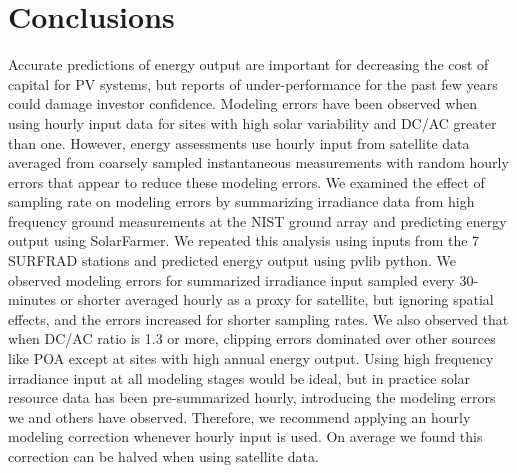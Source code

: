\documentclass[conference]{IEEEtran}
\begin{document}
\section{Conclusions}
Accurate predictions of energy output are important for decreasing the cost of capital for PV systems, but reports of under-performance for the past few years could damage investor confidence. Modeling errors have been observed when using hourly input data for sites with high solar variability and DC/AC greater than one. However, energy assessments use hourly input from satellite data averaged from coarsely sampled instantaneous measurements with random hourly errors that appear to reduce these modeling errors. We examined the effect of sampling rate on modeling errors by summarizing irradiance data from high frequency ground measurements at the NIST ground array and predicting energy output using SolarFarmer. We repeated this analysis using inputs from the 7 SURFRAD stations and predicted energy output using pvlib python. We observed modeling errors for summarized irradiance input sampled every 30-minutes or shorter averaged hourly as a proxy for satellite, but ignoring spatial effects, and the errors increased for shorter sampling rates. We also observed that when DC/AC ratio is 1.3 or more, clipping errors dominated over other sources like POA except at sites with high annual energy output. Using high frequency irradiance input at all modeling stages would be ideal, but in practice solar resource data has been pre-summarized hourly, introducing the modeling errors we and others have observed. Therefore, we recommend applying an hourly modeling correction whenever hourly input is used. On average we found this correction can be halved when using satellite data.

\balance


\end{document}
